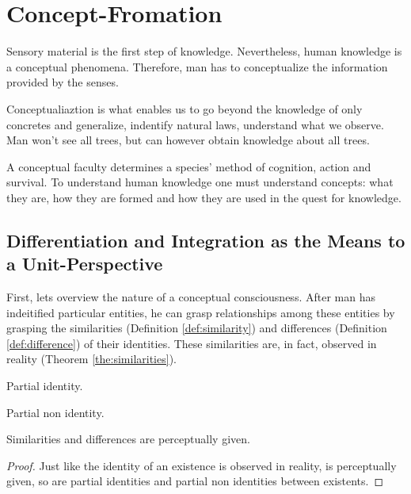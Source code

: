 \chapter{Concept-Fromation}

    Sensory material is the first step of knowledge. Nevertheless, human knowledge is a conceptual phenomena. Therefore, man has to conceptualize the information provided by the senses.

    Conceptualiaztion is what enables us to go beyond the knowledge of only concretes and generalize, indentify natural laws, understand what we observe. Man won't see all trees, but can however obtain knowledge about all trees.

    A conceptual faculty determines a species' method of cognition, action and survival. To understand human knowledge one must understand concepts: what they are, how they are formed and how they are used in the quest for knowledge.

    \section{Differentiation and Integration as the Means to a Unit-Perspective}

        First, lets overview the nature of a conceptual consciousness. After man has indeitified particular entities, he can grasp relationships among these entities by grasping the similarities (Definition \ref{def:similarity}) and differences (Definition \ref{def:difference}) of their identities. These similarities are, in fact, observed in reality (Theorem \ref{the:similarities}).

            \begin{definition}[Similarity]
            \label{def:similarity}
                Partial identity.
            \end{definition}

            \begin{definition}[Difference]
            \label{def:difference}
                Partial non identity.
            \end{definition}

            \begin{theorem}
            \label{the:similarities}
                Similarities and differences are perceptually given.
            \end{theorem}

            \begin{proof}
                Just like the identity of an existence is observed in reality, is perceptually given, so are partial identities and partial non identities between existents.
            \end{proof}

